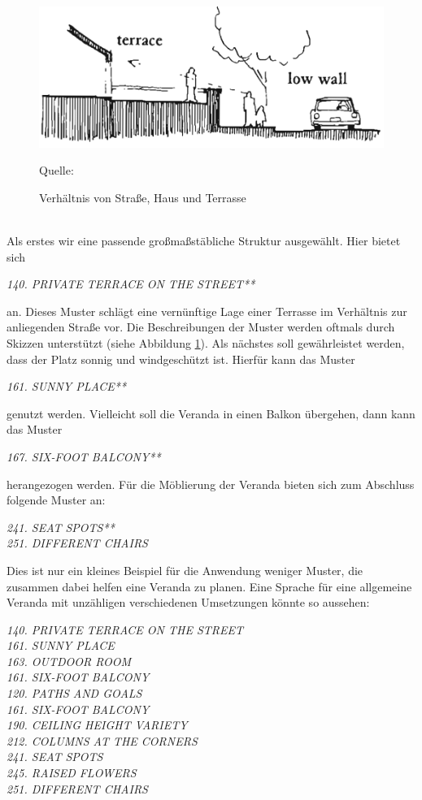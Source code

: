 \documentclass[fontsize=11pt,a4paper,final]{scrreprt}[2003/01/01]
\newcommand*{\quelle}{%
	\footnotesize Quelle: 
}
\begin{document}
\begin{figure}[H]
	\centering
	\includegraphics[width=0.8\linewidth]{Bilder/Terasse.png}
	\caption{Verhältnis von Straße, Haus und Terrasse}
	\quelle{ \cite[S. 667]{Alexander1977}}
	\label{fig:Terasse}
\end{figure} \ \\
Als erstes wir eine passende großmaßstäbliche Struktur ausgewählt. Hier bietet sich 
\begin{center}
	\textit{140. PRIVATE TERRACE ON THE STREET**}
\end{center} an. Dieses Muster schlägt eine vernünftige Lage einer Terrasse im Verhältnis zur anliegenden Straße vor. Die Beschreibungen der Muster werden oftmals durch Skizzen unterstützt (siehe Abbildung \ref{fig:Terasse}). Als nächstes soll gewährleistet werden, dass der Platz sonnig und windgeschützt ist. Hierfür kann das Muster
\begin{center}
	\textit{161. SUNNY PLACE**}
\end{center}
genutzt werden. Vielleicht soll die Veranda in einen Balkon übergehen, dann kann das Muster
\begin{center}
	\textit{167. SIX-FOOT BALCONY**}
\end{center}
herangezogen werden. Für die Möblierung der Veranda bieten sich zum Abschluss folgende Muster an:
\begin{center}
	\textit{241. SEAT SPOTS**} \\
	\textit{251. DIFFERENT CHAIRS}	
\end{center}
Dies ist nur ein kleines Beispiel für die Anwendung weniger Muster, die zusammen dabei helfen eine Veranda zu planen. Eine Sprache für eine allgemeine Veranda mit unzähligen verschiedenen Umsetzungen könnte so aussehen: 
\begin{center}
\textit{140. PRIVATE TERRACE ON THE STREET} \\
\textit{161. SUNNY PLACE} \\
\textit{163. OUTDOOR ROOM} \\
\textit{161. SIX-FOOT BALCONY} \\
\textit{120. PATHS AND GOALS} \\
\textit{161. SIX-FOOT BALCONY} \\
\textit{190. CEILING HEIGHT VARIETY} \\
\textit{212. COLUMNS AT THE CORNERS} \\
\textit{241. SEAT SPOTS} \\
\textit{245. RAISED FLOWERS} \\
\textit{251. DIFFERENT CHAIRS}
\end{center}
\end{document}
